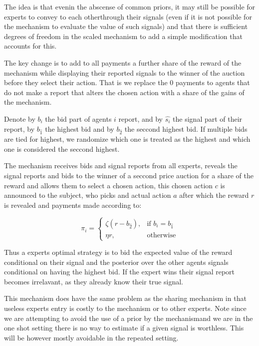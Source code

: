 The idea is that evenin the abscense of common priors, it may still be possible for experts to convey to each otherthrough their signals (even if it is not possible for the mechanism to evaluate the value of such signals) and that there is sufficient degrees of freedom in the scaled mechanism to add a simple modification that accounts for this.

The key change is to add to all payments a further share of the reward of the mechanism while displaying their reported signals to the winner of the auction before they select their action. That is we replace the 0 payments to agents that do not make a report that alters the chosen action with a  share of the gains of the mechanism.

Denote by $b_i$ the bid part of agents $i$ report, and by $\hat{s_i}$ the signal part of their report, by $b_{\hat{1}}$ the highest bid and by $b_{\hat{2}}$ the seccond highest bid. If multiple bids are tied for highest, we  randomize which one is treated as the highest and which one is considered the seccond highest.

\begin{mech}
The mechanism receives bids and signal reports from all experts, reveals the signal reports and bids to the winner of a seccond price auction for a share of the reward and allows them to select a chosen action, this chosen action $c$ is announced to the subject, who picks and actual action $a$ after which the reward $r$ is revealed and payments made according to:


\[
    \pi_i = 
\begin{cases}
    \zeta (r - b_{\hat{2}} ) ,& \text{if } b_i = b_{\hat{1}}\\
    \eta r,              & \text{otherwise}
\end{cases}
\]

\end{mech}

Thus a experts optimal strategy is to bid the expected value of the reward conditional on their signal and the posterior over the other agents signals conditional on having the highest bid. If the expert wins their signal report becomes irrelavant, as they already know their true signal.

This mechanism does have the same problem as the sharing mechanism in that useless experts entry is costly to the mechanism or to other experts. Note since we are attempting to avoid the use of a prior by the mechanismand we are in the one shot setting there is no way to estimate if a given signal is worthless. This will be however mostly avoidable in the repeated setting.  

